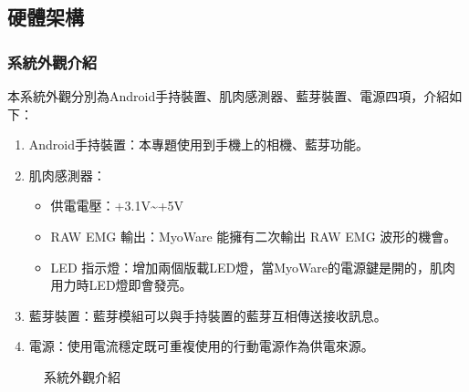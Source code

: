 \documentclass[12pt]{article}  %
\theoremstyle{plain}
\begin{document}
\subsection{硬體架構}

\subsubsection{系統外觀介紹}
本系統外觀分別為Android手持裝置、肌肉感測器、藍芽裝置、電源四項，介紹如下：
\begin{enumerate}
\item Android手持裝置：本專題使用到手機上的相機、藍芽功能。
\item 肌肉感測器：
\begin{itemize}
\item 供電電壓：+3.1V\textasciitilde +5V
\item RAW EMG 輸出：MyoWare 能擁有二次輸出 RAW EMG 波形的機會。
\item LED 指示燈：增加兩個版載LED燈，當MyoWare的電源鍵是開的，肌肉用力時LED燈即會發亮。
\end{itemize}
\item 藍芽裝置：藍芽模組可以與手持裝置的藍芽互相傳送接收訊息。
\item 電源：使用電流穩定既可重複使用的行動電源作為供電來源。
\end{enumerate}

\begin{figure}[h]  %
\quad
{}
\quad
{}
\quad
{}
\caption{系統外觀介紹}
\end{figure}
\end{document}
